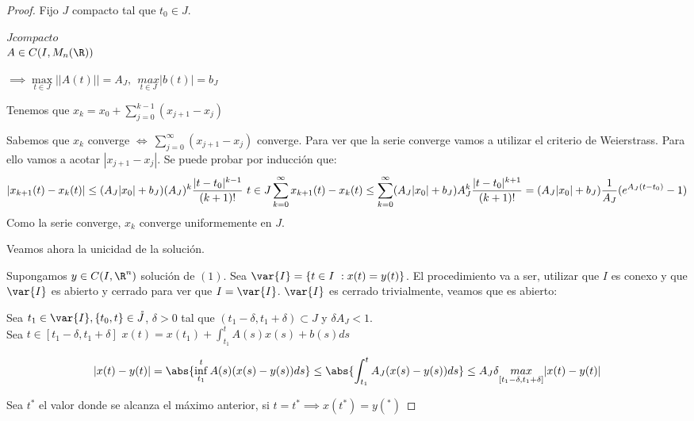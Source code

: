 \begin{proof}

  Fijo $J$ compacto tal que $t_0 \in J$.\\

  \begin{rcases}
    $J compacto$\\
    $A \in C ( I, M_n (\R))$
  \end{rcases}

  $\implies \underset{t \in J}{\max} || A(t) || = A_J , \ \ \underset{t \in J}{max} |b(t)| = b_J $

  Tenemos que $x_k = x_0 + \sum_{j=0}^{k-1} (x_{j+1} - x_j)$

  Sabemos que $x_k$ converge $\iff \ \sum_{j=0}^{\infty} (x_{j+1} - x_j )$ converge. Para ver que la serie converge vamos a utilizar el criterio de Weierstrass. Para ello vamos a acotar $|x_{j+1} - x_j |$. Se puede probar por inducción que:
  \[
  |x_{k+1} (t) - x_k (t) | \leq (A_J |x_0| + b_J) (A_J )^k \frac{|t-t_0| ^{k-1}}{(k+1)!} \ t \in J\\
  \sum_{k=0}^{\infty} x_{k+1} (t) - x_k (t) \leq \sum_{k=0} ^{\infty} (A_J |x_0| + b_J) A_J ^k \frac{|t-t_0|^{k+1}}{(k+1)!} = (A_J |x_0| + b_J) \frac{1}{A_J} (e^{A_J (t-t_0)}-1)
  \]
  Como la serie converge, $x_k$ converge uniformemente en $J$.

  Veamos ahora la unicidad de la solución.

  Supongamos $y \in C(I,\R ^n)$ solución de $(1)$. Sea $\var{I} = \{ t \in I \ : x(t) = y(t) \}$. El procedimiento va a ser, utilizar que $I$ es conexo y que $\var{I}$ es abierto y cerrado para ver que $I=\var{I}$. $\var{I}$ es cerrado trivialmente, veamos que es abierto:

  Sea $t_1 \in \var{I}, \{t_0 , t\} \in \mathring{J}$, $\delta > 0$ tal que $(t_1 - \delta , t_1 + \delta ) \subset J$ y $\delta A_J < 1$.\\
  Sea $t \in [t_1 - \delta, t_1 + \delta]$ $x(t) = x(t_1 ) + \int_{t_1} ^{t} A(s)x(s)+b(s) ds$

  \[
  |x(t) - y(t)| = \abs{\inf _{t_1} ^t A(s)(x(s) - y(s)) ds} \leq \abs{\int _{t_1} ^t A_J (x(s) - y(s)) ds} \leq A_J \delta \underset{[t_1 - \delta , t_1 + \delta]}{max} |x(t) - y(t)| 
  \]

  Sea $t^*$ el valor donde se alcanza el máximo anterior, si $t=t^* \implies x(t^*) = y(^*)$

  
\end{proof}
